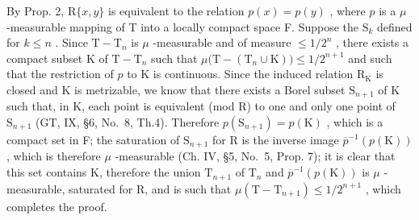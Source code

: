 By Prop. 2, \(\mathrm{R}\{x,y\}\) is equivalent to the relation \(p(x)=p(y)\) , where \(p\) is a \(\mu\) -measurable mapping of T into a locally compact space F. Suppose the \(\mathrm{S}_{k}\) defined for \(k\leqslant n\) . Since \(\mathrm{T}-\mathrm{T}_{n}\) is \(\mu\) -measurable and of measure \(\leqslant 1/2^{n}\) , there exists a compact subset K of \(\mathrm{T}-\mathrm{T}_{n}\) such that \(\mu\big(\mathrm{T}-(\mathrm{T}_{n}\cup\mathrm{K})\big)\leqslant 1/2^{n+1}\) and such that the restriction of \(p\) to K is continuous. Since the induced relation \(\mathrm{R}_{\mathrm{K}}\) is closed and K is metrizable, we know that there exists a Borel subset \(\mathrm{S}_{n+1}\) of K such that, in K, each point is equivalent (mod R) to one and only one point of \(\mathrm{S}_{n+1}\) (GT, IX, §6, No.~8, Th.4). Therefore \(p(\mathrm{S}_{n+1})=p(\mathrm{K})\) , which is a compact set in F; the saturation of \(\mathrm{S}_{n+1}\) for R is the inverse image \(\overline{p}^{-1}(p(\mathrm{K}))\) , which is therefore \(\mu\) -measurable (Ch. IV, §5, No.~5, Prop. 7); it is clear that this set contains K, therefore the union \(\mathrm{T}_{n+1}\) of \(\mathrm{T}_n\) and \(\overline{p}^{-1}(p(\mathrm{K}))\) is \(\mu\) -measurable, saturated for R, and is such that \(\mu(\mathrm{T} - \mathrm{T}_{n+1}) \leqslant 1/2^{n+1}\) , which completes the proof.

